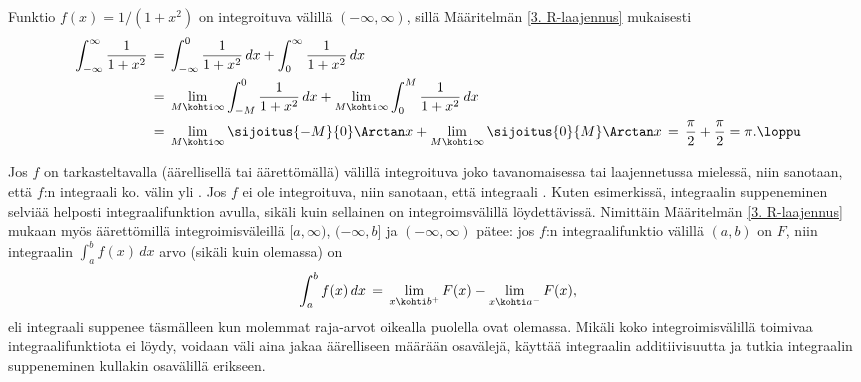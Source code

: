 \begin{Exa}
Funktio $f(x)=1/(1+x^2)$ on integroituva välillä $(-\infty,\infty)$, sillä Määritelmän
\ref{3. R-laajennus} mukaisesti
\begin{align*}
\int_{-\infty}^\infty \frac{1}{1+x^2} 
        &\,=\, \int_{-\infty}^0\frac{1}{1+x^2}\,dx + \int_0^\infty \frac{1}{1+x^2}\,dx \\
        &\,=\, \lim_{M \kohti\infty} \int_{-M}^0\frac{1}{1+x^2}\,dx
              +\lim_{M\kohti\infty} \int_0^M \frac{1}{1+x^2}\,dx \\
        &\,=\, \lim_{M\kohti\infty}\sijoitus{-M}{0} \Arctan x
              +\lim_{M\kohti\infty}\sijoitus{0}{M} \Arctan x
         \,=\, \frac{\pi}{2}+\frac{\pi}{2}=\pi. \loppu
\end{align*}
\end{Exa}
Jos $f$ on tarkasteltavalla (äärellisellä tai äärettömällä) välillä integroituva joko 
tavanomaisessa tai laajennetussa mielessä, niin sanotaan, että $f$:n integraali ko. välin yli
. Jos $f$ ei ole integroituva, niin sanotaan, että integraali
. Kuten esimerkissä, integraalin suppeneminen selviää helposti
integraalifunktion avulla, sikäli kuin sellainen on integroimsvälillä löydettävissä. Nimittäin
Määritelmän \ref{3. R-laajennus} mukaan myös äärettömillä integroimisväleillä $[a,\infty)$,
$(-\infty,b]$ ja $(-\infty,\infty)$ pätee: jos $f$:n integraalifunktio välillä $(a,b)$ on $F$,
niin integraalin $\int_a^b f(x)\,dx$ arvo (sikäli kuin olemassa) on
\[
\int_a^b f(x)\,dx \,=\, \lim_{x \kohti b^+}F(x)-\lim_{x \kohti a^-}F(x),
\]
eli integraali suppenee täsmälleen kun molemmat raja-arvot oikealla puolella ovat olemassa.
Mikäli koko integroimisvälillä toimivaa integraalifunktiota ei löydy, voidaan väli aina jakaa
äärelliseen määrään osavälejä, käyttää integraalin additiivisuutta ja tutkia integraalin
suppeneminen kullakin osavälillä erikseen.
